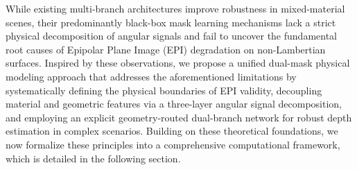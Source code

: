 While existing multi-branch architectures improve robustness in mixed-material scenes, their predominantly black-box mask learning mechanisms lack a strict physical decomposition of angular signals and fail to uncover the fundamental root causes of Epipolar Plane Image (EPI) degradation on non-Lambertian surfaces. Inspired by these observations, we propose a unified dual-mask physical modeling approach that addresses the aforementioned limitations by systematically defining the physical boundaries of EPI validity, decoupling material and geometric features via a three-layer angular signal decomposition, and employing an explicit geometry-routed dual-branch network for robust depth estimation in complex scenarios. Building on these theoretical foundations, we now formalize these principles into a comprehensive computational framework, which is detailed in the following section.
